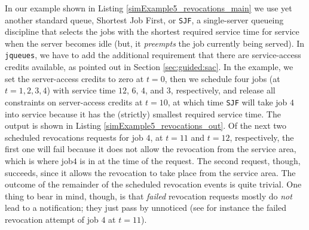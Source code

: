 \documentclass[12pt]{book}
\begin{document}
In our example shown in Listing \ref{simExample5_revocations_main}
  we use yet another standard queue, Shortest Job First,
  or \lstinline|SJF|, a single-server
  queueing discipline that selects
  the jobs with the shortest required service time
  for service when the server becomes idle
  (but, it {\em preempts\/} the job currently being served).
In \lstinline|jqueues|,
  we have to add the additional requirement
  that there are service-access credits available,
  as pointed out in Section \ref{sec:guided:sac}.
In the example,
  we set the server-access credits to zero at $t=0$,
  then we schedule four jobs (at
  $t=1, 2, 3, 4$) with service time
  $12$, $6$, $4$, and $3$, respectively,
  and release all constraints on server-access
  credits at $t=10$,
  at which time \lstinline|SJF| will
  take job $4$ into service because it has the (strictly) smallest
  required service time.
The output is shown in Listing \ref{simExample5_revocations_out}.
Of the next two scheduled revocations requests for job $4$,
  at $t=11$ and $t=12$, respectively,
  the first one will fail because it does not allow
  the revocation from the service area,
  which is where job$4$ is in at the time of the request.
The second request, though, succeeds, since it allows the
  revocation to take place from the service area.
The outcome of the remainder of the scheduled revocation events
  is quite trivial.
One thing to bear in mind, though,
  is that {\em failed\/} revocation requests mostly
  do {\em not\/} lead to a notification;
  they just pass by unnoticed
  (see for instance the failed revocation attempt
   of job $4$ at $t=11$).
  
\end{document}
